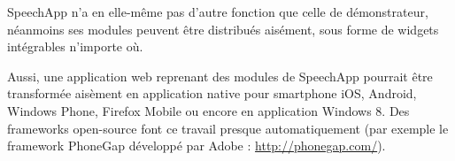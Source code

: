 \documentclass[a4paper,12pt]{report}
\begin{document}
\bigskip{}

SpeechApp n'a en elle-même pas d'autre fonction que celle de démonstrateur, néanmoins ses modules peuvent être distribués aisément, sous forme de widgets intégrables n'importe où.

\medskip{}

Aussi, une application web reprenant des modules de SpeechApp pourrait être transformée aisèment en application native pour smartphone iOS, Android, Windows Phone, Firefox Mobile ou encore en application Windows 8. Des frameworks open-source font ce travail presque automatiquement (par exemple le framework PhoneGap développé par Adobe : \url{http://phonegap.com/}).
\end{document}
